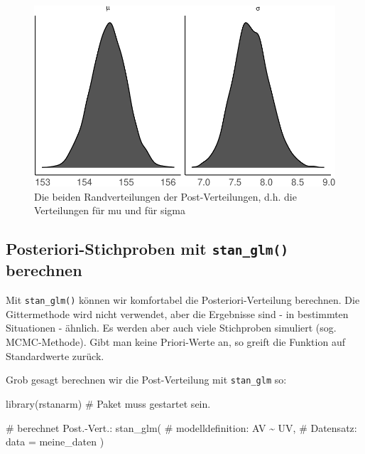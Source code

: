 \documentclass[
  a4paper,
  DIV=11]{scrreprt}
\newenvironment{Shaded}{\begin{snugshade}}{\end{snugshade}}
\newcommand{\AttributeTok}[1]{\textcolor[rgb]{0.40,0.45,0.13}{#1}}
\newcommand{\CommentTok}[1]{\textcolor[rgb]{0.37,0.37,0.37}{#1}}
\newcommand{\FunctionTok}[1]{\textcolor[rgb]{0.28,0.35,0.67}{#1}}
\newcommand{\NormalTok}[1]{\textcolor[rgb]{0.00,0.23,0.31}{#1}}
\newcommand{\SpecialCharTok}[1]{\textcolor[rgb]{0.37,0.37,0.37}{#1}}
\theoremstyle{definition}
\theoremstyle{remark}
\begin{document}
\begin{figure}

{\centering \includegraphics{./gauss_files/figure-pdf/fig-kung3-1.pdf}

}

\caption{\label{fig-kung3}Die beiden Randverteilungen der
Post-Verteilungen, d.h. die Verteilungen für mu und für sigma}

\end{figure}

\hypertarget{posteriori-stichproben-mit-stan_glm-berechnen}{%
\subsection{\texorpdfstring{Posteriori-Stichproben mit
\texttt{stan\_glm()}
berechnen}{Posteriori-Stichproben mit stan\_glm() berechnen}}\label{posteriori-stichproben-mit-stan_glm-berechnen}}

Mit \texttt{stan\_glm()} können wir komfortabel die
Posteriori-Verteilung berechnen. Die Gittermethode wird nicht verwendet,
aber die Ergebnisse sind - in bestimmten Situationen - ähnlich. Es
werden aber auch viele Stichproben simuliert (sog. MCMC-Methode). Gibt
man keine Priori-Werte an, so greift die Funktion auf Standardwerte
zurück.

Grob gesagt berechnen wir die Post-Verteilung mit \texttt{stan\_glm} so:

\begin{Shaded}
\begin{Highlighting}[]
\FunctionTok{library}\NormalTok{(rstanarm)  }\CommentTok{\# Paket muss gestartet sein.}

\CommentTok{\# berechnet Post.{-}Vert.:}
\FunctionTok{stan\_glm}\NormalTok{(}
  \CommentTok{\# modelldefinition:}
\NormalTok{  AV }\SpecialCharTok{\textasciitilde{}}\NormalTok{ UV,}
  \CommentTok{\# Datensatz:}
  \AttributeTok{data =}\NormalTok{ meine\_daten}
\NormalTok{)}
\end{Highlighting}
\end{Shaded}
\end{document}
